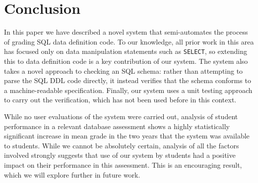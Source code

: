 \documentclass[sigconf, authordraft, capitalise]{acmart}
\begin{document}
\section{Conclusion}
\label{sec-conclusion}

In this paper we have described a novel system that semi-automates the process of grading SQL data definition code. To our knowledge, all prior work in this area has focused only on data manipulation statements such as \texttt{SELECT}, so extending this to data definition code is a key contribution of our system. The system also takes a novel approach to checking an SQL schema: rather than attempting to parse the SQL DDL code directly, it instead verifies that the schema conforms to a machine-readable specification. Finally, our system uses a unit testing approach to carry out the verification, which has not been used before in this context.

While no user evaluations of the system were carried out, analysis of student performance in a relevant database assessment shows a highly statistically significant increase in mean grade in the two years that the system was available to students. While we cannot be absolutely certain, analysis of all the factors involved strongly suggests that use of our system by students had a positive impact on their performance in this assessment. This is an encouraging result, which we will explore further in future work.




\end{document}
